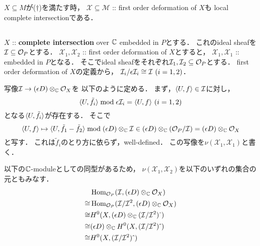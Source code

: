 \documentclass[a4paper]{jsarticle}
\newcommand{\defX}{\mathcal{X}}
\newcommand{\defM}{\mathcal{M}}
\begin{document}
    \begin{Thm}
        $X \subseteq M$が($\dagger$)を満たす時，
        $\defX \subseteq \defM$ :: first order deformation of $X$も
        local complete intersectionである．
    \end{Thm}

    \subsection{\tp{$\nu(\defX_1, \defX_2)$}{v(X1,X2)}}
    \begin{Def}
        $X$ :: \textbf{complete intersection} over $\mathbb{C}$ embedded in $P$とする．
        これのideal sheafを$\mathcal{I} \subseteq \mathcal{O}_P$とする．
        $\defX_1, \defX_2$ :: first order deformation of $X$とすると，
        $\defX_1, \defX_1$ :: embedded in $P$となる．
        そこでideal sheafをそれぞれ$\mathcal{I}_1, \mathcal{I}_2 \subseteq \mathcal{O}_P$とする．
        first order deformation of $X$の定義から，
        $\shI_i/\epsilon \shI_i \iso \shI \ (i=1,2)$．

        写像$\mathcal{I} \to (\epsilon D) \otimes_{\mathbb{C}} \mathcal{O}_X$を
        以下のように定める．
        まず，$\langle U,f \rangle \in \mathcal{I}$に対し，
        \[ \langle U,\tilde{f}_i \rangle \bmod \epsilon \mathcal{I}_i=\langle U,f \rangle \ (i=1,2) \]
        となる$\langle U,\tilde{f}_i \rangle$が存在する．
        そこで
        \[
            \langle U,f \rangle
            \mapsto
            \langle U,\tilde{f}_1-\tilde{f}_2 \rangle \bmod (\epsilon D) \otimes_{\mathbb{C}} \mathcal{I}
            \in (\epsilon D) \otimes_{\mathbb{C}} (\mathcal{O}_P/\mathcal{I})=(\epsilon D) \otimes_{\mathbb{C}} \mathcal{O}_X
        \]
        と写す．
        これは$\tilde{f}_i$のとり方に依らず，well-defined．
        この写像を$\nu(\defX_1, \defX_1)$と書く．

        以下の$\mathbb{C}$-moduleとしての同型があるため，
        $\nu(\defX_1, \defX_2)$を以下のいずれの集合の元ともみなす．
        \begin{align*}
            {}&   \operatorname{Hom}_{\mathcal{O}_P}(\mathcal{I}, (\epsilon D) \otimes_{\mathbb{C}} \mathcal{O}_X) \\
            \cong& \operatorname{Hom}_{\mathcal{O}_P}(\mathcal{I}/\mathcal{I}^2, (\epsilon D) \otimes_{\mathbb{C}} \mathcal{O}_X) \\
            \cong& H^0(X, (\epsilon D) \otimes_{\mathbb{C}} (\mathcal{I}/\mathcal{I}^2)\,\hat{}\,) \\
            \cong& (\epsilon D) \otimes_{\mathbb{C}} H^0(X, (\mathcal{I}/\mathcal{I}^2)\,\hat{}\,) \\
            \cong& H^0(X, (\mathcal{I}/\mathcal{I}^2)\,\hat{}\,)
        \end{align*}
    \end{Def}
\end{document}
